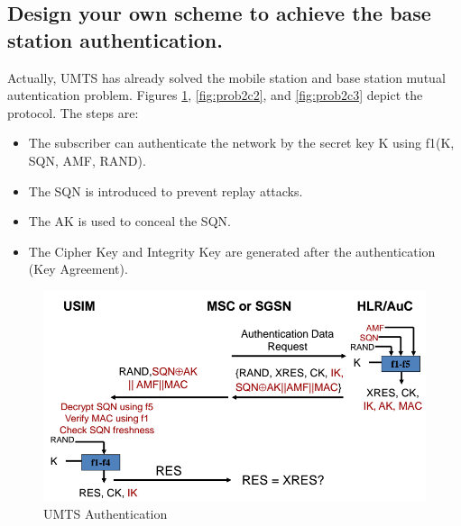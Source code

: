 \documentclass[a4paper]{report}
\begin{document}
\subsection{Design your own scheme to achieve the base station authentication.}

Actually, UMTS has already solved the mobile station and base station mutual autentication problem.
Figures \ref{fig:prob2c1}, \ref{fig:prob2c2}, and \ref{fig:prob2c3} depict the protocol. The steps are:

\begin{itemize}
\item The subscriber can authenticate the network by the secret key K using f1(K, SQN, AMF, RAND).
\item The SQN is introduced to prevent replay attacks.
\item The AK is used to conceal the SQN.
\item The Cipher Key and Integrity Key are generated after the authentication (Key Agreement).
\end{itemize}

\begin{figure}
\begin{mdframed}
\includegraphics[scale=0.2]{UMTS_Authentication_Protocol.png}
\caption{UMTS Authentication}
\label{fig:prob2c1}
\end{mdframed}
\end{figure}
\end{document}
